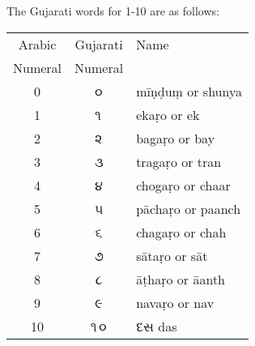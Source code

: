 The Gujarati words for 1-10 are as follows:
\medskip

\bgroup
\begin{center}
\gujarati
\begin{tabular}{ccl}
Arabic & Gujarati &Name\\
Numeral &Numeral  &\\
0	&૦	&mīṇḍuṃ or shunya\\
1	&૧	&ekaṛo or ek\\
2	&૨	&bagaṛo or bay\\
3	&૩	&tragaṛo or tran\\
4	&૪	&chogaṛo or chaar\\
5	&૫	&pāchaṛo or paanch\\
6	&૬	&chagaṛo or chah\\
7	&૭	&sātaṛo or sāt\\
8	&૮	&āṭhaṛo or āanth\\
9	&૯	&navaṛo or nav\\
10 &૧૦ &દસ das\\

\end{tabular}
\end{center}
\egroup
